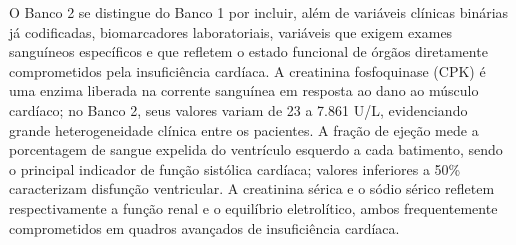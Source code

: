 \begin{table}[H]
\centering
\caption{Variáveis originais do Banco 2 (Heart Failure Clinical Records Dataset).}
\label{tab:features_banco2}
\end{table}

O Banco 2 se distingue do Banco 1 por incluir, além de variáveis clínicas binárias já codificadas, biomarcadores laboratoriais, variáveis que exigem exames sanguíneos específicos e que refletem o estado funcional de órgãos diretamente comprometidos pela insuficiência cardíaca. A creatinina fosfoquinase (CPK) é uma enzima liberada na corrente sanguínea em resposta ao dano ao músculo cardíaco; no Banco 2, seus valores variam de 23 a 7.861 U/L, evidenciando grande heterogeneidade clínica entre os pacientes. A fração de ejeção mede a porcentagem de sangue expelida do ventrículo esquerdo a cada batimento, sendo o principal indicador de função sistólica cardíaca; valores inferiores a 50\% caracterizam disfunção ventricular. A creatinina sérica e o sódio sérico refletem respectivamente a função renal e o equilíbrio eletrolítico, ambos frequentemente comprometidos em quadros avançados de insuficiência cardíaca.

